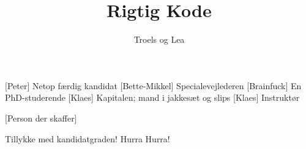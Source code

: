 \documentclass[a4paper,11pt]{article}
\title{Rigtig Kode}
\author{Troels og Lea}
\begin{document}
\maketitle

\begin{roles}
  [Peter] Netop færdig kandidat
  [Bette-Mikkel] Specialevejlederen
  [Brainfuck] En PhD-studerende
  [Klaes] Kapitalen; mand i jakkesæt og slips
  [Klaes] Instruktør
\end{roles}

\begin{props}
  [Person der skaffer]
\end{props}

\begin{sketch}


 Tillykke med kandidatgraden! Hurra Hurra!
\end{sketch}
\end{document}
